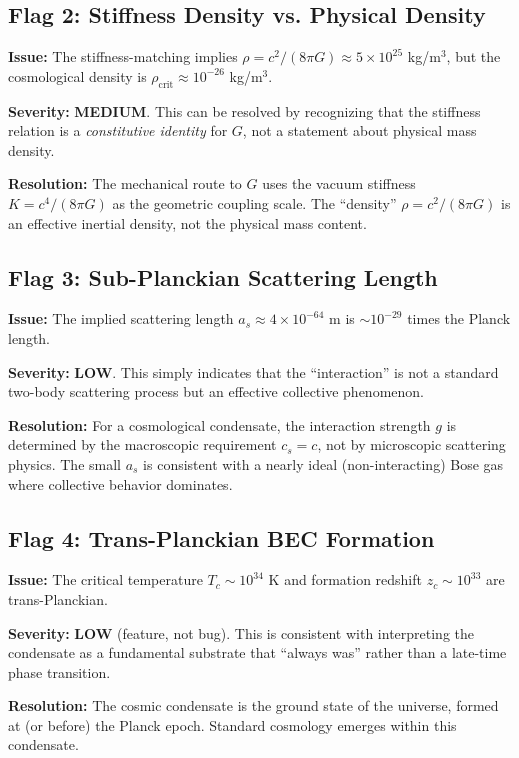 \documentclass[11pt,a4paper]{article}
\newcommand{\ee}[1]{\times 10^{#1}}
\newcommand{\rhocrit}{\ensuremath{\rho_{\mathrm{crit}}}}
\begin{document}
\subsection{Flag 2: Stiffness Density vs. Physical Density}

\textbf{Issue:} The stiffness-matching implies $\rho = c^2/(8\pi G) \approx 5 \ee{25}$ kg/m$^3$, but the cosmological density is $\rhocrit \approx 10^{-26}$ kg/m$^3$.

\textbf{Severity:} \textbf{MEDIUM}. This can be resolved by recognizing that the stiffness relation is a \emph{constitutive identity} for $G$, not a statement about physical mass density.

\textbf{Resolution:} The mechanical route to $G$ uses the vacuum stiffness $K = c^4/(8\pi G)$ as the geometric coupling scale. The ``density'' $\rho = c^2/(8\pi G)$ is an effective inertial density, not the physical mass content.

\subsection{Flag 3: Sub-Planckian Scattering Length}

\textbf{Issue:} The implied scattering length $a_s \approx 4 \ee{-64}$ m is $\sim 10^{-29}$ times the Planck length.

\textbf{Severity:} \textbf{LOW}. This simply indicates that the ``interaction'' is not a standard two-body scattering process but an effective collective phenomenon.

\textbf{Resolution:} For a cosmological condensate, the interaction strength $g$ is determined by the macroscopic requirement $c_s = c$, not by microscopic scattering physics. The small $a_s$ is consistent with a nearly ideal (non-interacting) Bose gas where collective behavior dominates.

\subsection{Flag 4: Trans-Planckian BEC Formation}

\textbf{Issue:} The critical temperature $T_c \sim 10^{34}$ K and formation redshift $z_c \sim 10^{33}$ are trans-Planckian.

\textbf{Severity:} \textbf{LOW} (feature, not bug). This is consistent with interpreting the condensate as a fundamental substrate that ``always was'' rather than a late-time phase transition.

\textbf{Resolution:} The cosmic condensate is the ground state of the universe, formed at (or before) the Planck epoch. Standard cosmology emerges within this condensate.
\end{document}
